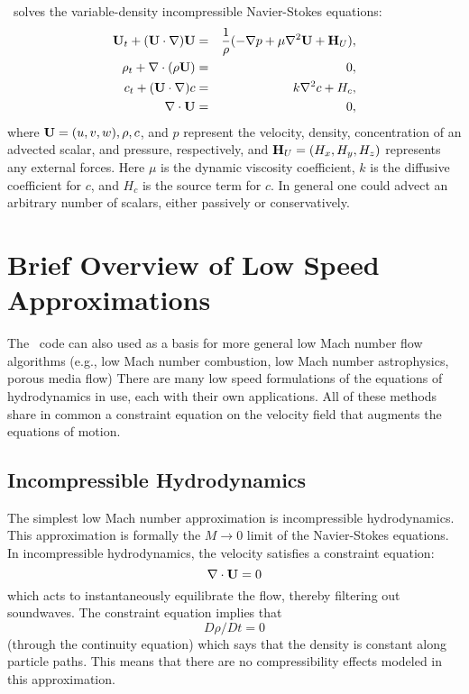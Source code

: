 \iamr\ solves the variable-density incompressible Navier-Stokes equations:
\begin{eqnarray}
{\bf U}_t + ({\bf U}\cdot\nabla){\bf U} &=& \frac{1}{\rho}(-\nabla p + \mu\nabla^2 {\bf U} + {\bf H}_U), \\
\rho_t + \nabla\cdot(\rho {\bf U}) &=& 0, \\
c_t + ({\bf U}\cdot\nabla)c &=& k\nabla^2 c + H_c, \\
\nabla\cdot {\bf U} &=& 0,
\end{eqnarray}
where ${\bf U} = (u, v, w), \rho, c$, and $p$ represent the velocity, density, concentration of an 
advected scalar, and pressure, respectively, and ${\bf H}_U = (H_x , H_y , H_z )$ represents any external
forces. Here $\mu$ is the dynamic viscosity coefficient, $k$ is the diffusive coefficient for $c$, and
$H_c$ is the source term for $c$. In general one could advect an arbitrary number of scalars,
either passively or conservatively.

\section{Brief Overview of Low Speed Approximations}

The \iamr\ code can also used as a basis for more
general low Mach number flow algorithms (e.g., low Mach number combustion,
low Mach number astrophysics, porous media flow)
There are many low speed formulations of the equations of hydrodynamics
in use, each with their own applications.  All of these methods share in
common a constraint equation on the velocity field that augments the
equations of motion.  

\subsection{Incompressible Hydrodynamics}

The simplest low Mach number approximation is incompressible
hydrodynamics. This approximation is formally the $M \rightarrow 0$
limit of the Navier-Stokes equations. In incompressible hydrodynamics,
the velocity satisfies a constraint equation:
\begin{equation}
\nabla \cdot {\bf U} = 0
\end{equation}
which acts to instantaneously equilibrate the flow, thereby filtering
out soundwaves.  The constraint equation implies that
\begin{equation}
D\rho/Dt = 0
\end{equation}
(through the continuity equation) which says that the density is
constant along particle paths. This means that there are no
compressibility effects modeled in this approximation.

